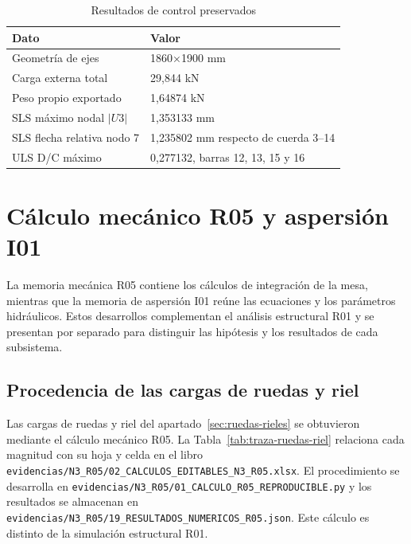 \begin{table}[H]
\centering
\small
\caption{Resultados de control preservados}
\begin{tabularx}{\textwidth}{YP{4.0cm}}
\toprule
\textbf{Dato} & \textbf{Valor} \\
\midrule
Geometría de ejes & 1860×1900 mm \\
Carga externa total & 29,844 kN \\
Peso propio exportado & 1,64874 kN \\
SLS máximo nodal $|U3|$ & 1,353133 mm \\
SLS flecha relativa nodo 7 & 1,235802 mm respecto de cuerda 3--14 \\
ULS D/C máximo & 0,277132, barras 12, 13, 15 y 16 \\
\bottomrule
\end{tabularx}
\end{table}

\section{Cálculo mecánico R05 y aspersión I01}

La memoria mecánica R05 contiene los cálculos de integración de la mesa, mientras que la memoria de aspersión I01 reúne las ecuaciones y los parámetros hidráulicos. Estos desarrollos complementan el análisis estructural R01 y se presentan por separado para distinguir las hipótesis y los resultados de cada subsistema.

\subsection{Procedencia de las cargas de ruedas y riel}
\label{sec:traza-ruedas-riel}

Las cargas de ruedas y riel del apartado~\ref{sec:ruedas-rieles} se obtuvieron mediante el cálculo mecánico R05. La Tabla~\ref{tab:traza-ruedas-riel} relaciona cada magnitud con su hoja y celda en el libro \nolinkurl{evidencias/N3_R05/02_CALCULOS_EDITABLES_N3_R05.xlsx}. El procedimiento se desarrolla en \nolinkurl{evidencias/N3_R05/01_CALCULO_R05_REPRODUCIBLE.py} y los resultados se almacenan en \nolinkurl{evidencias/N3_R05/19_RESULTADOS_NUMERICOS_R05.json}. Este cálculo es distinto de la simulación estructural R01.

